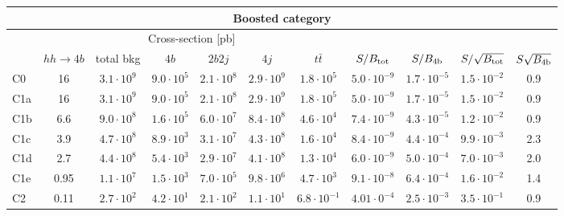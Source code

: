 \begin{tabular}{|l|cc|cccc|cccc|}
  \hline
\multicolumn{11}{|c|}{Boosted category}\\
\hline
&  \multicolumn{6}{c|}{Cross-section [pb]} &  &  & &  \\
   &  $hh\to 4b$ &  total bkg  &   $4b$    &  $2b2j$   &   $4j$    &
$t\bar{t}$ &
$S/B_{\rm tot}$ & $S/B_{\rm 4b}$ & $S/\sqrt{B_{\rm tot}}$ & $S\sqrt{B_{\rm 4b}}$ \\
  \hline
  \hline
 C0      & 16  &   $3.1\cdot 10^9$   & $9.0\cdot 10^5$ & $2.1\cdot 10^8$ & $2.9\cdot 10^9$ & $1.8\cdot 10^5$ &   $5.0\cdot 10^{-9}$   & $1.7\cdot 10^{-5}$  &   $1.5\cdot 10^{-2}$   & 0.9 \\
 C1a     & 16  &   $3.1\cdot 10^9 $  & $9.0\cdot 10^5$ & $2.1\cdot 10^8$ & $2.9\cdot 10^9$ & $1.8\cdot 10^5$ &   $5.0\cdot 10^{-9}$   & $1.7\cdot 10^{-5}$   &   $1.5\cdot 10^{-2}$   & 0.9 \\
 C1b     & 6.6  &   $9.0\cdot 10^8 $  & $1.6\cdot 10^5$ & $6.0\cdot 10^7$ & $8.4\cdot 10^8$ & $4.6\cdot 10^4$ &   $7.4\cdot 10^{-9}$   & $4.3\cdot 10^{-5}$   &   $1.2\cdot 10^{-2}$   & 0.9 \\
 C1c     & 3.9  &   $4.7\cdot 10^8 $  & $8.9\cdot 10^3$ & $3.1\cdot 10^7$ & $4.3\cdot 10^8$ & $1.6\cdot 10^4$   &  $ 8.4\cdot 10^{-9}$   & $4.4\cdot 10^{-4}$  &  $ 9.9\cdot 10^{-3}$   & 2.3 \\
 C1d     & 2.7  &   $4.4\cdot 10^8 $  & $5.4\cdot 10^3$ & $2.9\cdot 10^7$ & $4.1\cdot 10^8$ & $1.3\cdot 10^4$ &   $6.0\cdot 10^{-9}$   & $5.0\cdot 10^{-4}$  &   $7.0\cdot 10^{-3}$   & 2.0 \\
 C1e     & 0.95  &   $1.1\cdot 10^7$   & $1.5\cdot 10^3$ & $7.0\cdot 10^5$ & $9.8\cdot 10^6$ & $4.7\cdot 10^3$  &  $ 9.1\cdot 10^{-8}$   & $6.4\cdot 10^{-4}$  &   $1.6\cdot 10^{-2}$   & 1.4 \\
 C2      & 0.11  &   $2.7\cdot 10^2$   & $4.2\cdot 10^1$ & $2.1\cdot 10^2$ & $1.1\cdot 10^1$ & $6.8\cdot 10^{-1}$  &  $ 4.01\cdot 0^{-4}$   & $2.5\cdot 10^{-3}$  &   $3.5\cdot 10^{-1}$   & 0.9 \\
\hline
\end{tabular}
